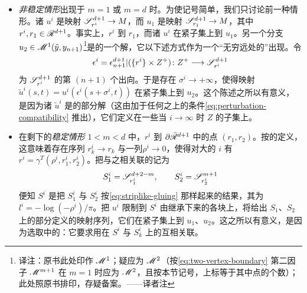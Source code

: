 \begin{itemize}
\item \emph{非稳定情形}出现于 $m=1$ 或 $m=d$ 时。为使记号简单，我们只讨论前一种情形。诸 $u^i$ 是映射 $\mathscr{S}^{d+1}_{r^i}\to M$，而 $u_1$ 是映射 $\mathscr{S}^{d+1}_{r_1}\to M$，其中 $r^i,r_1\in\mathscr{R}^{d+1}$。事实上，$r^i$ \trConvergence{}到 $r_1$，而诸 $u^i$ 在紧子集上\trConvergence{}到 $u_1$。另一个分支 $u_2\in\mathscr{M}^1(\tilde{y},y_{n+1})$\footnote{译注：原书此处印作 $\mathscr{M}^1$；疑应为 $\mathscr{M}^2$（按\eqref{eq:two-vertex-boundary} 第二因子 $\mathscr{M}^{m+1}$ 在 $m=1$ 时应为 $\mathscr{M}^2$，且按本节记号，上标等于其中点的个数）；此处照原书排印，存疑备案。——译者注}是\trFloerEquation{}的一个解，它以下述方式作为一个“无穷远处的\trBubble”出现。令
\begin{equation*}
\epsilon^i=\epsilon^{d+1}_{n+1}|(\{r^i\}\times Z^+)\colon Z^+\longrightarrow\mathscr{S}^{d+1}_{r^i}
\end{equation*}
为 $\mathscr{S}^{d+1}_{r^i}$ 的第 $(n{+}1)$ 个出向\trStriplikeEnd。于是存在 $\sigma^i\to+\infty$，使得\trRescaling{}映射 $\tilde{u}^i(s,t)=u^i(\epsilon^i(s+\sigma^i,t))$ 在紧子集上\trConvergence{}到 $u_2$。这个陈述之所以有意义，是因为诸 $\tilde{u}^i$ 是\trFloerEquation{}的部分解（这由加于任何\trPerturbationDatum{}之上的条件\eqref{eq:perturbation-compatibility} 推出），它们定义在一些当 $i\to\infty$ 时\trExhausting{} $Z$ 的子集上。
\item 在剩下的\emph{稳定情形} $1<m<d$ 中，$r^i$ \trConvergence{}到 $\partial\bar{\mathscr{R}}^{d+1}$ 中的点 $(r_1,r_2)$。按\trTopology{}的定义，这意味着存在\trConvergence{}序列 $r^i_k\to r_k$ 与一列\trGluingParameter{}$\rho^i\to 0$，使得对大的 $i$ 有 $r^i=\gamma^T(\rho^i,r^i_1,r^i_2)$。把与之相关联的\trPointedDisc{}记为
\begin{equation*}
S^i_1=\mathscr{S}^{d+2-m}_{r^i_1},\qquad S^i_2=\mathscr{S}^{m+1}_{r^i_2}
\end{equation*}
便知 $S^i$ 是把 $S^i_1$ 与 $S^i_2$ 按\eqref{eq:striplike-gluing} 那样\trGluing{}起来的结果，其\trGluingLength{}为 $l^i=-\log(-\rho^i)/\pi$。把 $u^i$ 限制到 $S^i$ 由\trGluing{}继承下来的各块上，将给出 $S_1$、$S_2$ 上的部分定义的映射序列，它们在紧子集上\trConvergence{}到 $u_1$、$u_2$。这之所以有意义，是因为\trPerturbationDatum{}选取中的\trConsistency：它要求用在 $S^i$ 与 $S^i_k$ 上的\trPerturbationDatum{}互相关联。
\end{itemize}
